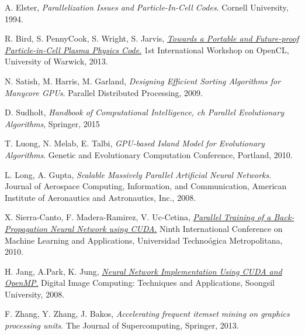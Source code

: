 \documentclass[twocolumn]{article} %
\begin{document}
	\begin{thebibliography}{5}
			A. Elster,
			\emph{Parallelization Issues and Particle-In-Cell Codes}.
			Cornell University,
			1994.
			
			R. Bird, S. PennyCook, S. Wright, S. Jarvis,
			\href{http://eprints.dcs.warwick.ac.uk/1753/1/bird-iwocl2013.pdf}{
			\emph{Towards a Portable and Future-proof Particle-in-Cell Plasma Physics Code}.}
			1st International Workshop on OpenCL,
			University of Warwick,
			2013.
			
			N. Satish, M. Harris, M. Garland,
			\emph{Designing Efficient Sorting Algorithms for Manycore GPUs}.
			Parallel Distributed Processing,
			2009.
			
			D. Sudholt,
			\emph{Handbook of Computational Intelligence, ch Parallel Evolutionary Algorithms},
			Springer,
			2015
		
			T. Luong, N. Melab, E. Talbi,
			\emph{GPU-based Island Model for Evolutionary Algorithms}.
			Genetic and Evolutionary Computation Conference,
			Portland,
			2010.
			
			L. Long, A. Gupta,
			\emph{Scalable Massively Parallel Artificial Neural Networks}.
			Journal of Aerospace Computing, Information, and Communication,
			American Institute of Aeronautics and Astronautics, Inc.,
			2008.
			
			X. Sierra-Canto, F. Madera-Ramirez, V. Uc-Cetina,
			\href{http://ieeexplore.ieee.org/xpls/abs_all.jsp?arnumber=5708849}{
			\emph{Parallel Training of a Back-Propagation Neural Network using CUDA}.}
			Ninth International Conference on Machine Learning and Applications,
			Universidad Techno\'ogica Metropolitana,
			2010.
			
			H. Jang, A.Park, K. Jung,
			\href{http://ieeexplore.ieee.org/xpls/abs_all.jsp?arnumber=4700015}{
			\emph{Neural Network Implementation Using CUDA and OpenMP}.}
			Digital Image Computing: Techniques and Applications,
			Soongsil University,
			2008.
			
			F. Zhang, Y. Zhang, J. Bakos,
			\emph{Accelerating frequent itemset mining on graphics processing units}.
			The Journal of Supercomputing, Springer,
			2013.
						
	\end{thebibliography}
\end{document}
